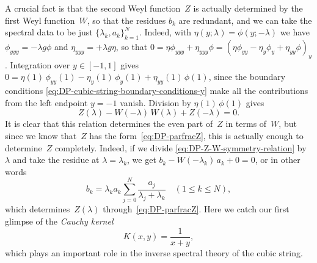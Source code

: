 \documentclass[10pt,a4paper]{article} \pdfoutput=1 
\begin{document}
A crucial fact is that the second Weyl function~$Z$ is actually determined by the
first Weyl function~$W$, so that the residues $b_k$ are redundant, and
we can take the spectral data to be just $\{ \lambda_k , a_k \}_{k=1}^N$.
Indeed, with $\eta(y;\lambda) = \phi(y;-\lambda)$ we have
$\phi_{yyy}=-\lambda g \phi$ and $\eta_{yyy}=+\lambda g \eta$, so that
$0 = \eta \phi_{yyy} + \eta_{yyy} \phi = (\eta \phi_{yy} - \eta_{y} \phi_{y} + \eta_{yy} \phi)_{y}$.
Integration over $y \in [-1,1]$ gives
$0 = \eta(1) \, \phi_{yy}(1) - \eta_{y}(1) \, \phi_{y}(1) + \eta_{yy}(1) \, \phi(1)$,
since the boundary conditions \eqref{eq:DP-cubic-string-boundary-conditions-y} make all the
contributions from the left endpoint $y=-1$ vanish.
Division by $\eta(1) \, \phi(1)$ gives
\begin{equation}
  \label{eq:DP-Z-W-symmetry-relation}
  Z(\lambda) - W(-\lambda) \, W(\lambda) + Z(-\lambda) = 0.
\end{equation}
It is clear that this relation determines the even part of~$Z$ in terms of~$W$,
but since we know that~$Z$ has the form~\eqref{eq:DP-parfracZ},
this is actually enough to determine~$Z$ completely.
Indeed, if we divide \eqref{eq:DP-Z-W-symmetry-relation} by~$\lambda$
and take the residue at $\lambda=\lambda_k$,
we get $b_k - W(-\lambda_k) \, a_k + 0 = 0$,
or in other words
\begin{equation}
  \label{eq:DP-bk}
  b_k = \lambda_k a_k \sum_{j=0}^N \frac{a_j}{\lambda_j+\lambda_k}
  \quad (1 \le k \le N)
  ,
\end{equation}
which determines~$Z(\lambda)$ through~\eqref{eq:DP-parfracZ}.
Here we catch our first glimpse of the \emph{Cauchy kernel}
\begin{equation}
  \label{eq:DP-cauchy-kernel}
  K(x,y)=\frac{1}{x+y},
\end{equation}
which plays an important role in the
inverse spectral theory of the cubic string.
\end{document}
